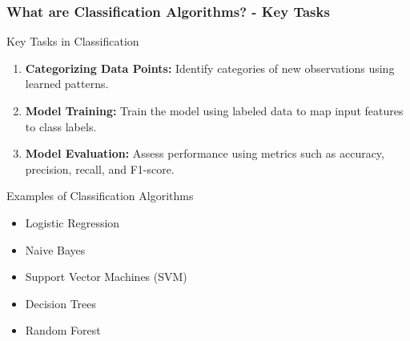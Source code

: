 \documentclass[aspectratio=169]{beamer}
\begin{document}
\begin{frame}[fragile]
    \frametitle{What are Classification Algorithms? - Key Tasks}
    \begin{block}{Key Tasks in Classification}
        \begin{enumerate}
            \item \textbf{Categorizing Data Points:} Identify categories of new observations using learned patterns.
            \item \textbf{Model Training:} Train the model using labeled data to map input features to class labels.
            \item \textbf{Model Evaluation:} Assess performance using metrics such as accuracy, precision, recall, and F1-score.
        \end{enumerate}
    \end{block}
    
    \begin{block}{Examples of Classification Algorithms}
        \begin{itemize}
            \item Logistic Regression
            \item Naive Bayes
            \item Support Vector Machines (SVM)
            \item Decision Trees
            \item Random Forest
        \end{itemize}
    \end{block}
\end{frame}
\end{document}
